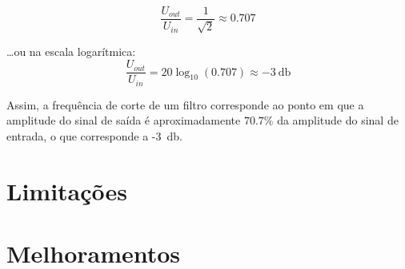 	\begin{equation} \label{eq:relacaoGanho}
		\frac{U_{out}}{U_{in}} = \frac{1}{\sqrt{2}} \approx 0.707
	\end{equation}
	
	\ldots ou na escala logarítmica:  
\begin{equation} \label{eq:relacaoGanhodB}
	\frac{U_{out}}{U_{in}} = 20 \log_{10} (0.707) \approx -\SI{3}{\decibel}	
\end{equation}
	
Assim, a frequência de corte de um filtro corresponde ao ponto em que a amplitude do sinal de saída é aproximadamente $70.7\%$ da amplitude do sinal de entrada, o que corresponde a -\SI{3}{\decibel}. 




\section{Limitações}
\section{Melhoramentos}


